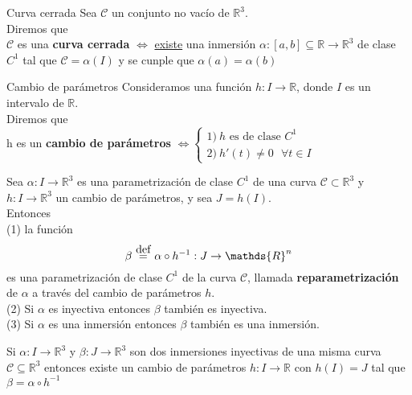 \documentclass{report}
\newcommand\defeq{\stackrel{\mathclap{\normalfont\mbox{def}}}{~=~}}
\newcommand\reals{\mathds{R}}
\begin{document}
\begin{defbox}{Curva cerrada}
	Sea \(\mathcal{C}\) un conjunto no vacío de \(\reals^3\). \\
	Diremos que \\
	$\mathcal{C}$ es una \textbf{curva cerrada} $\iff$ \underline{existe} una inmersión $\alpha : [a,b] \subseteq\reals\rightarrow\reals^3$ de clase $C^1$ tal que $\mathcal{C}=\alpha (I)$ y se cunple que $\alpha (a) = \alpha (b)$
\end{defbox}

\begin{defbox}{Cambio de parámetros}
	Consideramos una función $h: I \rightarrow \reals$, donde $I$ es un intervalo de $\reals$. \\
	Diremos que \\
	h es un \textbf{cambio de parámetros} $\iff
		\left\{ \begin{array}{cc}
			1)~ h\text{ es de clase } C^1 \\
			2)~ h'(t) \ne 0 ~~~ \forall t \in I
		\end{array}\right.
	$
\end{defbox}

\begin{propobox}[label=propo:reparametrizacion]
	Sea $\alpha : I \rightarrow \reals^3$ es una parametrización de clase $C^1$ de una curva $\mathcal{C} \subset \reals^3$ y $h: I \rightarrow \reals^3$ un cambio de parámetros, y sea $J=h(I)$. \\
	Entonces \\
	(1) la función
	\[
		\beta \defeq \alpha \circ h^{-1}:J\rightarrow \reals^n
	\]
	es una parametrización de clase $C^1$ de la curva $\mathcal{C}$, llamada \textbf{reparametrización} de $\alpha$ a través del cambio de parámetros $h$. \\
	(2) Si $\alpha$ es inyectiva entonces $\beta$ también es inyectiva. \\
	(3) Si $\alpha$ es una inmersión entonces $\beta$ también es una inmersión.
\end{propobox}

\begin{propobox}[label=propo:existencia_cambio_param]
	Si $\alpha : I \rightarrow \reals^3$ y $\beta : J \rightarrow \reals^3$ son dos inmersiones inyectivas de una misma curva $\mathcal{C}\subseteq\reals^3$ entonces existe un cambio de parámetros $h: I \rightarrow \reals$ con $h(I)=J$ tal que $\beta = \alpha \circ h^{-1}$
\end{propobox}
\end{document}
